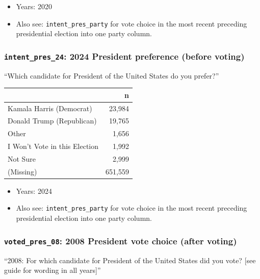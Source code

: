 \documentclass[10pt,article,oneside]{memoir}
\begin{document}
\begin{itemize}
\tightlist
\item
  Years: 2020
\item
  Also see: \texttt{intent\_pres\_party} for vote choice in the most
  recent preceding presidential election into one party column.
\end{itemize}

\subsubsection{\texorpdfstring{\texttt{intent\_pres\_24}: 2024 President
preference (before
voting)}{intent\_pres\_24: 2024 President preference (before voting)}}\label{intent_pres_24-2024-president-preference-before-voting}

``Which candidate for President of the United States do you prefer?''

\begin{table}[H]
\centering
\begin{tabular}[t]{lr}
\toprule
 & n\\
\midrule
Kamala Harris (Democrat) & 23,984\\
Donald Trump (Republican) & 19,765\\
Other & 1,656\\
I Won't Vote in this Election & 1,992\\
Not Sure & 2,999\\
(Missing) & 651,559\\
\bottomrule
\end{tabular}
\end{table}

\begin{itemize}
\tightlist
\item
  Years: 2024
\item
  Also see: \texttt{intent\_pres\_party} for vote choice in the most
  recent preceding presidential election into one party column.
\end{itemize}

\subsubsection{\texorpdfstring{\texttt{voted\_pres\_08}: 2008 President
vote choice (after
voting)}{voted\_pres\_08: 2008 President vote choice (after voting)}}\label{voted_pres_08-2008-president-vote-choice-after-voting}

``2008: For which candidate for President of the United States did you
vote? {[}see guide for wording in all years{]}''
\end{document}
